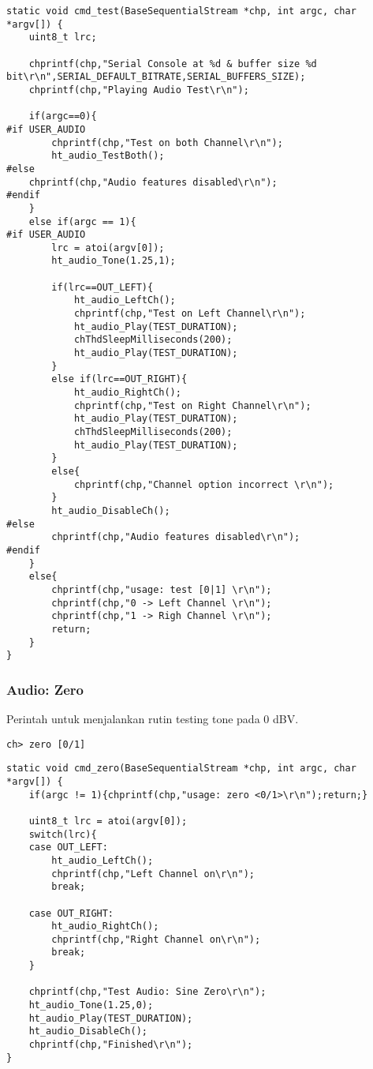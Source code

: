 \documentclass[12pt,]{article}
\begin{document}
	\begin{verbatim}
static void cmd_test(BaseSequentialStream *chp, int argc, char *argv[]) {
	uint8_t lrc;
	
	chprintf(chp,"Serial Console at %d & buffer size %d bit\r\n",SERIAL_DEFAULT_BITRATE,SERIAL_BUFFERS_SIZE);
	chprintf(chp,"Playing Audio Test\r\n");
	
	if(argc==0){
#if USER_AUDIO
		chprintf(chp,"Test on both Channel\r\n");
		ht_audio_TestBoth();
#else
	chprintf(chp,"Audio features disabled\r\n");
#endif
	}
	else if(argc == 1){
#if USER_AUDIO
		lrc = atoi(argv[0]);
		ht_audio_Tone(1.25,1);
	
		if(lrc==OUT_LEFT){
			ht_audio_LeftCh();
			chprintf(chp,"Test on Left Channel\r\n");
			ht_audio_Play(TEST_DURATION);
			chThdSleepMilliseconds(200);
			ht_audio_Play(TEST_DURATION);
		}
		else if(lrc==OUT_RIGHT){
			ht_audio_RightCh();
			chprintf(chp,"Test on Right Channel\r\n");
			ht_audio_Play(TEST_DURATION);
			chThdSleepMilliseconds(200);
			ht_audio_Play(TEST_DURATION);
		}
		else{
			chprintf(chp,"Channel option incorrect \r\n");
		}
		ht_audio_DisableCh();
#else
		chprintf(chp,"Audio features disabled\r\n");
#endif
	}
	else{
		chprintf(chp,"usage: test [0|1] \r\n");
		chprintf(chp,"0 -> Left Channel \r\n");
		chprintf(chp,"1 -> Righ Channel \r\n");
		return;
	}
}
	\end{verbatim}

	\newpage
	\subsubsection{Audio: Zero}
	Perintah untuk menjalankan rutin testing tone pada 0 dBV.
	\begin{verbatim}
ch> zero [0/1]
	\end{verbatim}

	\begin{verbatim}
static void cmd_zero(BaseSequentialStream *chp, int argc, char *argv[]) {
	if(argc != 1){chprintf(chp,"usage: zero <0/1>\r\n");return;}
	
	uint8_t lrc = atoi(argv[0]);
	switch(lrc){
	case OUT_LEFT:
		ht_audio_LeftCh();
		chprintf(chp,"Left Channel on\r\n");
		break;
	
	case OUT_RIGHT:
		ht_audio_RightCh();
		chprintf(chp,"Right Channel on\r\n");
		break;
	}
	
	chprintf(chp,"Test Audio: Sine Zero\r\n");
	ht_audio_Tone(1.25,0);
	ht_audio_Play(TEST_DURATION);
	ht_audio_DisableCh();
	chprintf(chp,"Finished\r\n");
}
	\end{verbatim}
\end{document}
